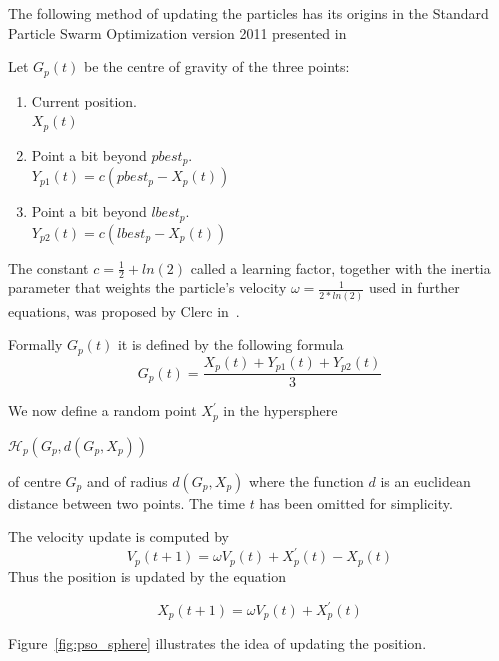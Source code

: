 \documentclass{book}
\begin{document}
The following method of updating the particles has its origins in the Standard Particle Swarm Optimization version 2011 presented in~\cite{pso_11}

Let $G_p(t)$ be the centre of gravity of the three points:
\begin{enumerate}
    \item Current position. \\
    $X_p(t)$
    
    \item Point a bit beyond $pbest_p$. \\
    $Y_{p1}(t) = c(pbest_p-X_p(t))$
    
    \item Point a bit beyond $lbest_p$. \\
    $Y_{p2}(t) = c(lbest_p-X_p(t))$
    
\end{enumerate}

The constant $c = \frac{1}{2} + ln(2)$ called a learning factor, together with the inertia parameter that weights the particle's velocity $\omega = \frac{1}{2 * ln(2)}$ used in further equations, was proposed by Clerc in~\cite{pso_anal}.

Formally $G_p(t)$ it is defined by the following formula 
\begin{equation}
G_p(t) = \frac{X_p(t) + Y_{p1}(t) + Y_{p2}(t)} {3}
\end{equation}

We now define a random point $X^{'}_p$ in the hypersphere
\begin{center}
    $\mathcal{H}_p(G_p, d(G_p, X_p))$ 
\end{center}
of centre $G_p$ and of radius $d(G_p, X_p)$ where the function $d$ is an euclidean distance between two points. The time $t$ has been omitted for simplicity.

The velocity update is computed by
\begin{equation}
V_p(t+1) = \omega  V_p(t) + X^{'}_p(t) - X_p(t)
\end{equation}
Thus the position is updated by the equation

\begin{equation}
X_p(t+1) = \omega  V_p(t) + X^{'}_p(t)
\end{equation}

Figure~\ref{fig:pso_sphere} illustrates the idea of updating the position.
\end{document}
